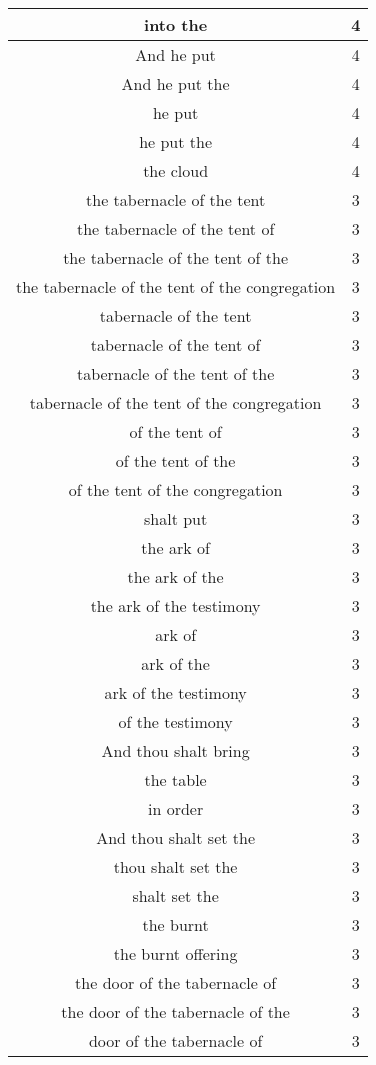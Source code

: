 \begin{center}
\begin{longtable}{|c|c|}
into the & 4\\ \hline 
And he put & 4\\ \hline 
And he put the & 4\\ \hline 
he put & 4\\ \hline 
he put the & 4\\ \hline 
the cloud & 4\\ \hline 
the tabernacle of the tent & 3\\ \hline 
the tabernacle of the tent of & 3\\ \hline 
the tabernacle of the tent of the & 3\\ \hline 
the tabernacle of the tent of the congregation & 3\\ \hline 
tabernacle of the tent & 3\\ \hline 
tabernacle of the tent of & 3\\ \hline 
tabernacle of the tent of the & 3\\ \hline 
tabernacle of the tent of the congregation & 3\\ \hline 
of the tent of & 3\\ \hline 
of the tent of the & 3\\ \hline 
of the tent of the congregation & 3\\ \hline 
shalt put & 3\\ \hline 
the ark of & 3\\ \hline 
the ark of the & 3\\ \hline 
the ark of the testimony & 3\\ \hline 
ark of & 3\\ \hline 
ark of the & 3\\ \hline 
ark of the testimony & 3\\ \hline 
of the testimony & 3\\ \hline 
And thou shalt bring & 3\\ \hline 
the table & 3\\ \hline 
in order & 3\\ \hline 
And thou shalt set the & 3\\ \hline 
thou shalt set the & 3\\ \hline 
shalt set the & 3\\ \hline 
the burnt & 3\\ \hline 
the burnt offering & 3\\ \hline 
the door of the tabernacle of & 3\\ \hline 
the door of the tabernacle of the & 3\\ \hline 
door of the tabernacle of & 3\\ \hline 

\end{longtable}
\end{center}
